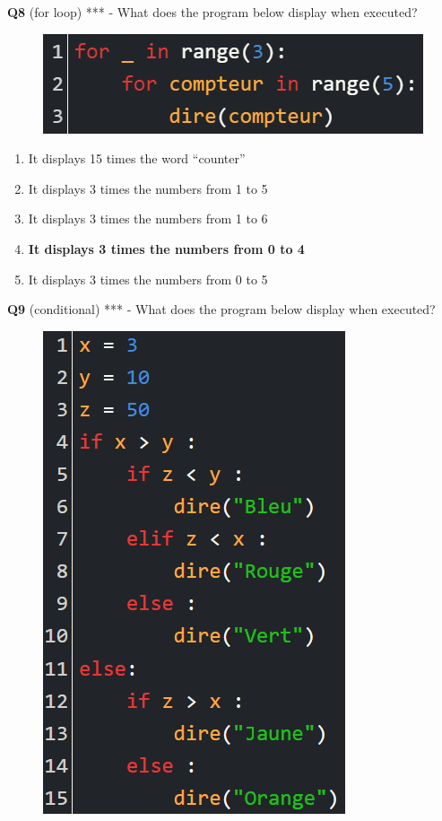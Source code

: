 \documentclass[14pt]{extarticle}
\begin{document}
\newpage
\textbf{Q8}
(for loop) *** - What does the program below display when executed?
\begin{figure}[H]
    \centering
    \includegraphics[width=0.7\linewidth]{images/posttest/_Q8.png}
\end{figure}

\begin{enumerate}[label=\alph*)]
    \item It displays 15 times the word “counter”
    \item It displays 3 times the numbers from 1 to 5
    \item It displays 3 times the numbers from 1 to 6
    \item \textbf{It displays 3 times the numbers from 0 to 4}
    \item It displays 3 times the numbers from 0 to 5
\end{enumerate}
\newpage
\textbf{Q9} (conditional) *** -
What does the program below display when executed?
\begin{figure}[H]
    \centering
    \includegraphics[width=0.55\linewidth]{images/posttest/_Q9.png}
\end{figure}
\end{document}
